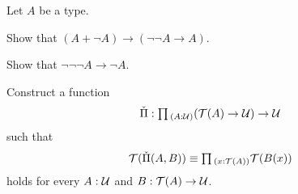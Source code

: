 \begin{exercises}
\item Let $A$ be a type.
  \begin{subexenum}
  \item Show that $(A+\neg A)\to(\neg\neg A\to A)$.
  \item Show that $\neg\neg\neg A \to \neg A$.
  \end{subexenum}
\item Construct a function
  \begin{equation*}
    \check{\Pi}:\prd{A:\UU} (\Ty(A)\to\UU)\to \UU
  \end{equation*}
  such that
  \begin{equation*}
    \Ty(\check{\Pi}(A,B))\jdeq \prd{x:\Ty(A)}\Ty(B(x))
  \end{equation*}
  holds for every $A:\mathcal{U}$ and $B:\mathcal{T}(A)\to\mathcal{U}$. 
  

\end{exercises}
